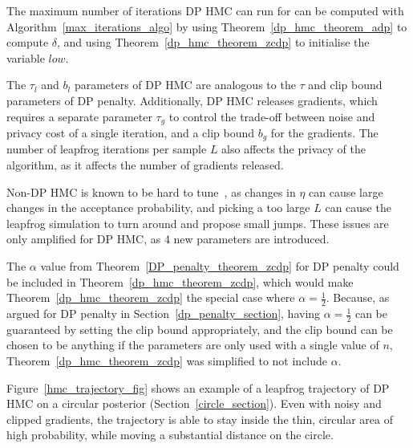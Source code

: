 \documentclass[english,twoside,openright]{HYgraduMLDS}
\begin{document}
The maximum number of iterations DP HMC can run for can be computed with
Algorithm~\ref{max_iterations_algo} by using Theorem~\ref{dp_hmc_theorem_adp}
to compute \(\delta\), and using Theorem~\ref{dp_hmc_theorem_zcdp}
to initialise the variable \(low\).

The \(\tau_{l}\) and \(b_{l}\) parameters of DP HMC are analogous to the
\(\tau\) and clip bound parameters of DP penalty. Additionally, DP HMC
releases gradients, which requires a separate parameter \(\tau_{g}\) to
control the trade-off between noise and privacy cost of a single iteration,
and a clip bound \(b_{g}\) for the gradients. The number of leapfrog iterations
per sample \(L\) also affects the privacy of the algorithm, as it affects the
number of gradients released.

Non-DP HMC is known to be hard to tune~\cite{neal2012mcmc},
as changes in \(\eta\) can cause large changes in the acceptance probability,
and picking a too large \(L\) can cause the leapfrog simulation to turn
around and propose small jumps. These issues are only amplified for DP HMC,
as 4 new parameters are introduced.

The \(\alpha\) value from Theorem~\ref{DP_penalty_theorem_zcdp} for
DP penalty could be included in Theorem~\ref{dp_hmc_theorem_zcdp},
which would make Theorem~\ref{dp_hmc_theorem_zcdp} the special case where
\(\alpha = \frac{1}{2}\). Because, as argued for DP penalty in
Section~\ref{dp_penalty_section}, having \(\alpha = \frac{1}{2}\) can be
guaranteed by setting the clip bound appropriately, and the clip bound can
be chosen to be anything if the parameters are only used with a single value
of \(n\),
Theorem~\ref{dp_hmc_theorem_zcdp} was simplified to not include \(\alpha\).

Figure~\ref{hmc_trajectory_fig} shows an example of a leapfrog trajectory
of DP HMC on a circular posterior (Section~\ref{circle_section}).
Even with noisy and clipped gradients,
the trajectory is able to stay inside the thin, circular area of high probability,
while moving a substantial distance on the circle.
\end{document}
